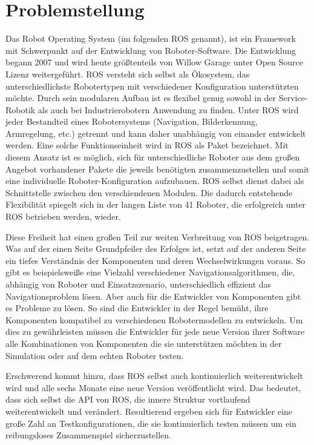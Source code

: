 \chapter{Problemstellung}

Das Robot Operating System (im folgenden ROS genannt), ist ein Framework mit Schwerpunkt auf der Entwicklung von Roboter-Software. Die Entwicklung begann 2007 und wird heute größtenteils von Willow Garage unter Open Source Lizenz weitergeführt. ROS versteht sich selbst als Ökosystem, das unterschiedlichste Robotertypen mit verschiedener Konfiguration unterstützten möchte. Durch sein modularen Aufbau ist es flexibel genug sowohl in der Service-Robotik als auch bei Industrierobotern Anwendung zu finden. Unter ROS wird jeder Bestandteil eines Robotersystems (Navigation, Bilderkennung, Armregelung, etc.) getrennt und kann daher unabhängig von einander entwickelt werden. Eine solche Funktionseinheit wird in ROS als Paket bezeichnet. Mit diesem Ansatz ist es möglich, sich für unterschiedliche Roboter aus dem großen Angebot vorhandener Pakete die jeweils benötigten zusammenzustellen und somit eine individuelle Roboter-Konfiguration aufzubauen. ROS selbst dienst dabei als Schnittstelle zwischen den verschiendenen Modulen. Die dadurch entstehende Flexibilität spiegelt sich in der langen Liste von 41 Roboter\cite{ros_robot_list}, die erfolgreich unter ROS betrieben werden, wieder.

Diese Freiheit hat einen großen Teil zur weiten Verbreitung von ROS beigetragen. Was auf der einen Seite Grundpfeiler des Erfolges ist, setzt auf der anderen Seite ein tiefes Verständnis der Komponenten und deren Wechselwirkungen voraus. So gibt es beispielsweiße eine Vielzahl verschiedener Navigationsalgorithmen, die, abhängig von Roboter und Einsatzszenario, unterschiedlich effizient das Navigationsproblem lösen. Aber auch für die Entwickler von Komponenten gibt es Probleme zu lösen. So sind die Entwickler in der Regel bemüht, ihre Komponenten kompatibel zu verschiedenen Robotermodellen zu entwickeln. Um dies zu gewährleisten müssen die Entwickler für jede neue Version ihrer Software alle Kombinationen von Komponenten die sie unterstützen möchten in der Simulation oder auf dem echten Roboter testen. 

Erschwerend kommt hinzu, dass ROS selbst auch kontinuierlich weiterentwickelt wird und alle sechs Monate eine neue Version veröffentlicht wird. Das bedeutet, dass sich selbst die API von ROS, die innere Struktur vortlaufend weiterentwickelt und verändert. Resultierend ergeben sich für Entwickler eine große Zahl an Testkonfigurationen, die sie kontinuierlich testen müssen um ein reibungsloses Zusammenspiel sicherzustellen.


